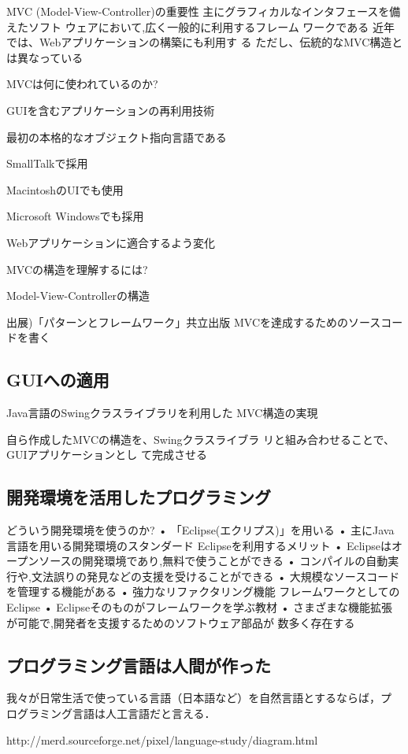 \documentclass[a4j, twoside]{jsbook}
\begin{document}
MVC (Model-View-Controller)の重要性
 主にグラフィカルなインタフェースを備えたソフト
ウェアにおいて,広く一般的に利用するフレーム
ワークである
 近年では、Webアプリケーションの構築にも利用す
る
 ただし、伝統的なMVC構造とは異なっている

MVCは何に使われているのか?

GUIを含むアプリケーションの再利用技術

最初の本格的なオブジェクト指向言語である

SmallTalkで採用

MacintoshのUIでも使用

Microsoft Windowsでも採用

Webアプリケーションに適合するよう変化

MVCの構造を理解するには?

Model-View-Controllerの構造

出展)「パターンとフレームワーク」共立出版
MVCを達成するためのソースコードを書く

\subsection{GUIへの適用}
Java言語のSwingクラスライブラリを利用した
MVC構造の実現

自ら作成したMVCの構造を、Swingクラスライブラ
リと組み合わせることで、GUIアプリケーションとし
て完成させる

\subsection{開発環境を活用したプログラミング}
どういう開発環境を使うのか?
• 「Eclipse(エクリプス)」を用いる
• 主にJava言語を用いる開発環境のスタンダード
Eclipseを利用するメリット
• Eclipseはオープンソースの開発環境であり,無料で使うことができる
• コンパイルの自動実行や,文法誤りの発見などの支援を受けることができる
• 大規模なソースコードを管理する機能がある
• 強力なリファクタリング機能
フレームワークとしてのEclipse
• Eclipseそのものがフレームワークを学ぶ教材
• さまざまな機能拡張が可能で,開発者を支援するためのソフトウェア部品が
数多く存在する

\subsection{プログラミング言語は人間が作った}

我々が日常生活で使っている言語（日本語など）を自然言語とするならば，プ
ログラミング言語は人工言語だと言える．

http://merd.sourceforge.net/pixel/language-study/diagram.html
\end{document}

